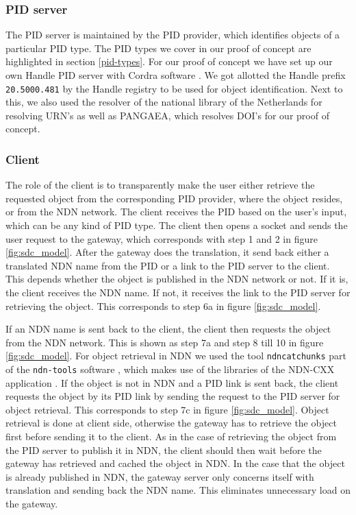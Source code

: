 \subsubsection{PID server}
The PID server is maintained by the PID provider, which identifies objects of a particular PID type. The PID types we cover in our proof of concept are highlighted in section \ref{pid-types}. For our proof of concept we have set up our own Handle PID server with Cordra software \cite{cor}. We got allotted the Handle prefix \texttt{20.5000.481} by the Handle registry to be used for object identification. Next to this, we also used the resolver of the national library of the Netherlands for resolving URN's as well as PANGAEA, which resolves DOI's for our proof of concept.

\subsubsection{Client}\label{client}
The role of the client is to transparently make the user either retrieve the requested object from the corresponding PID provider, where the object resides, or from the NDN network. The client receives the PID based on the user's input, which can be any kind of PID type. The client then opens a socket and sends the user request to the gateway, which corresponds with step 1 and 2 in figure \ref{fig:sdc_model}. After the gateway does the translation, it send back either a translated NDN name from the PID or a link to the PID server to the client. This depends whether the object is published in the NDN network or not. If it is, the client receives the NDN name. If not, it receives the link to the PID server for retrieving the object. This corresponds to step 6a in figure \ref{fig:sdc_model}.

If an NDN name is sent back to the client, the client then requests the object from the NDN network. This is shown as step 7a and step 8 till 10 in figure \ref{fig:sdc_model}. For object retrieval in NDN we used the tool \texttt{ndncatchunks} part of the \texttt{ndn-tools} software \cite{ndn-tools}, which makes use of the libraries of the NDN-CXX application \cite{ndn-tools}. 
If the object is not in NDN and a PID link is sent back, the client requests the object by its PID link by sending the request to the PID server for object retrieval. This corresponds to step 7c in figure \ref{fig:sdc_model}. Object retrieval is done at client side, otherwise the gateway has to retrieve the object first before sending it to the client. 
As in the case of retrieving the object from the PID server to publish it in NDN, the client should then wait before the gateway has retrieved and cached the object in NDN. 
In the case that the object is already published in NDN, the gateway server only concerns itself with translation and sending back the NDN name. This eliminates unnecessary load on the gateway.

